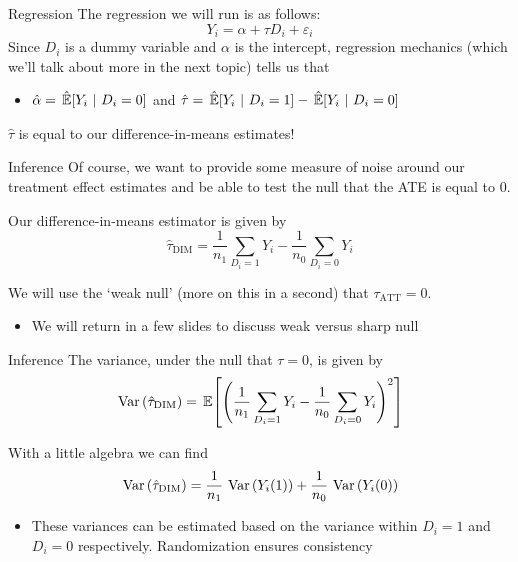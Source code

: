 \documentclass[aspectratio=169,t,11pt,table]{beamer}
\begin{document}
\begin{frame}{Regression}
  The regression we will run is as follows:
  $$
    Y_i = \alpha + \tau D_i + \varepsilon_i
  $$
  Since $D_i$ is a dummy variable and $\alpha$ is the intercept, regression mechanics (which we'll talk about more in the next topic) tells us that 
  \begin{itemize}
    \item $\hat{\alpha} = \expechat{Y_i}{D_i = 0}$ and $\hat{\tau} = \expechat{Y_i}{D_i = 1} - \expechat{Y_i}{D_i = 0}$
  \end{itemize}

  \bigskip
  $\hat{\tau}$ is equal to our difference-in-means estimates! 
\end{frame}

\begin{frame}{Inference}
  Of course, we want to provide some measure of noise around our treatment effect estimates and be able to test the null that the ATE is equal to 0. 
  
  \bigskip
  Our difference-in-means estimator is given by
  $$
    \hat{\tau}_{\text{DIM}} = \frac{1}{n_1} \sum_{D_i = 1} Y_i - \frac{1}{n_0} \sum_{D_i = 0} Y_i
  $$

	\bigskip
  We will use the `weak null' (more on this in a second) that $\tau_{\text{ATT}} = 0$. 
	\begin{itemize}
		\item We will return in a few slides to discuss weak versus sharp null
	\end{itemize}
\end{frame}

\begin{frame}{Inference}
  The variance, under the null that $\tau = 0$, is given by
  $$
    \var{\hat{\tau}_{\text{DIM}}} = \expec{ \left( \frac{1}{n_1} \sum_{D_i = 1} Y_i - \frac{1}{n_0} \sum_{D_i = 0} Y_i \right)^2 }
  $$

  With a little algebra we can find
	\begin{align*}
		\var{\hat{\tau}_{\text{DIM}}} = \frac{1}{n_1} \var{Y_{i}(1)} + \frac{1}{n_0} \var{Y_{i}(0)}
	\end{align*}
	\begin{itemize}
		\item These variances can be estimated based on the variance within $D_i =
			1$ and $D_i = 0$ respectively. Randomization ensures consistency
	\end{itemize}
\end{frame}
\end{document}
